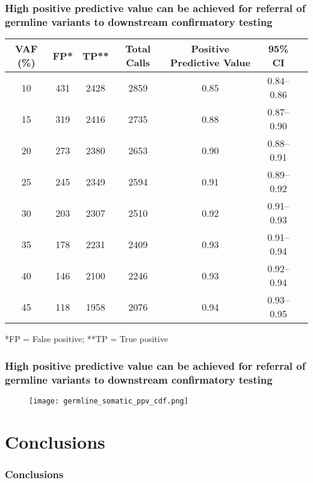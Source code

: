 \documentclass{beamer}
\begin{document}
\begin{frame}
\frametitle{High positive predictive value can be achieved for referral of germline variants to downstream confirmatory testing}
\centering
\scriptsize
\begin{table}
\centering
      \begin{tabular}{ccccccl}
        \hline
        VAF (\%) & FP* & TP** & Total Calls & Positive Predictive Value & 95\% CI
        \\
        \hline
        10 & 431 & 2428 & 2859 & 0.85 & 0.84--0.86
        \\
        15 & 319 & 2416 & 2735 & 0.88 & 0.87--0.90
        \\
        20 & 273 & 2380 & 2653 & 0.90 & 0.88--0.91
        \\
        25 & 245 & 2349 & 2594 & 0.91 & 0.89--0.92
        \\
        30 & 203 & 2307 & 2510 & 0.92 & 0.91--0.93
        \\
        35 & 178 & 2231 & 2409 & 0.93 & 0.91--0.94
        \\
        40 & 146 & 2100 & 2246 & 0.93 & 0.92--0.94
        \\
        45 & 118 & 1958 & 2076 & 0.94 & 0.93--0.95
        \\
				\hline
      \end{tabular}
      *FP = False positive; **TP = True positive
\end{table}
\end{frame}

\begin{frame}
\frametitle{High positive predictive value can be achieved for referral of germline variants to downstream confirmatory testing}
\begin{figure}[t]
    \texttt{[image: germline\_somatic\_ppv\_cdf.png]}
\end{figure}
\end{frame}

\section{Conclusions}
\begin{frame}
\frametitle{Conclusions}
\begin{enumerate}
\end{enumerate}
\end{frame}
\end{document}
